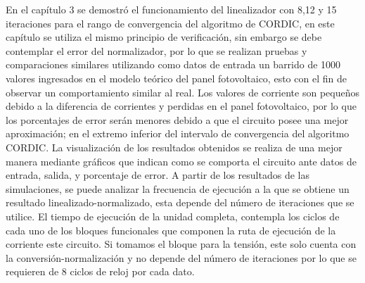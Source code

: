 En el capítulo 3 se demostró el funcionamiento del linealizador con 8,12 y 15 iteraciones para el rango de convergencia del algoritmo de CORDIC, en este capítulo se utiliza el mismo principio de verificación, sin embargo se debe contemplar el error del normalizador, por lo que se realizan pruebas y comparaciones similares utilizando como datos de entrada un barrido de 1000 valores ingresados en el modelo teórico del panel fotovoltaico, esto con el fin de observar un comportamiento similar al real. Los valores de corriente son pequeños debido a la diferencia de corrientes y perdidas en el panel fotovoltaico, por lo que los porcentajes de error serán menores debido a que el circuito posee una mejor aproximación; en el extremo inferior del intervalo de convergencia del algoritmo CORDIC. 
La visualización de los resultados obtenidos se realiza de una mejor manera mediante gráficos que indican como se comporta el circuito ante datos de entrada, salida, y porcentaje de error. A partir de los resultados de las simulaciones, se puede analizar la frecuencia de ejecución a la que se obtiene un resultado linealizado-normalizado, esta depende del número de iteraciones que se utilice.
El tiempo de ejecución de la unidad completa, contempla los ciclos de cada uno de los bloques funcionales que componen la ruta de ejecución de la corriente este circuito.
Si tomamos el bloque para la tensión, este solo cuenta con la conversión-normalización y no depende del número de iteraciones por lo que se requieren de 8 ciclos de reloj por cada dato. 

\newpage


